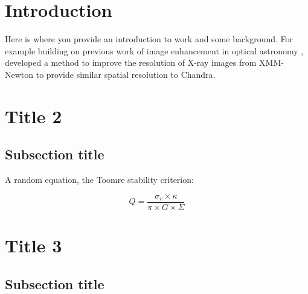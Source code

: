 \documentclass[final,5p,times,twocolumn,authoryear]{elsarticle}
\begin{document}
\section{Introduction}
\label{introduction}

Here is where you provide an introduction to work and some background. For example building on previous work of image enhancement in optical astronomy \citep{vojtekova2021learning}, \cite{sweere2022deep} developed a method to improve the resolution of X-ray images from XMM-Newton to provide similar spatial resolution to Chandra.

\section{Title 2}
\lipsum[1]

\subsection{Subsection title}

A random equation, the Toomre stability criterion:

\begin{equation}
    Q = \frac{\sigma_v \times \kappa}{\pi \times G \times \Sigma}
\end{equation}

\section{Title 3}
\lipsum[2]

\subsection{Subsection title}
\lipsum[3]

\end{document}
